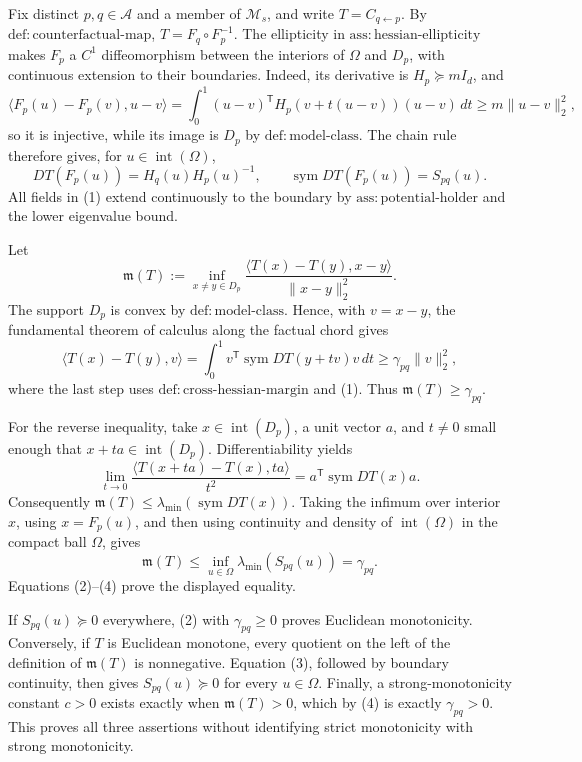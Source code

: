 Fix distinct \(p,q\in\mathcal A\) and a member of \(\mathcal M_s\), and write \(T=C_{q\leftarrow p}\).  By \(\mathrm{def:counterfactual\text{-}map}\), \(T=F_q\circ F_p^{-1}\).  The ellipticity in \(\mathrm{ass:hessian\text{-}ellipticity}\) makes \(F_p\) a \(C^1\) diffeomorphism between the interiors of \(\Omega\) and \(D_p\), with continuous extension to their boundaries.  Indeed, its derivative is \(H_p\succeq mI_d\), and
\[
 \langle F_p(u)-F_p(v),u-v\rangle
 =\int_0^1 (u-v)^{\mathsf T}H_p(v+t(u-v))(u-v)\,dt
 \ge m\lVert u-v\rVert_2^2,
\]
so it is injective, while its image is \(D_p\) by \(\mathrm{def:model\text{-}class}\).  The chain rule therefore gives, for \(u\in\operatorname{int}(\Omega)\),
\[
 DT(F_p(u))=H_q(u)H_p(u)^{-1},
 \qquad
 \operatorname{sym}DT(F_p(u))=S_{pq}(u).
 \tag{1}
\]
All fields in (1) extend continuously to the boundary by \(\mathrm{ass:potential\text{-}holder}\) and the lower eigenvalue bound.

Let
\[
 \mathfrak m(T):=\inf_{x\ne y\in D_p}
 \frac{\langle T(x)-T(y),x-y\rangle}{\lVert x-y\rVert_2^2}.
\]
The support \(D_p\) is convex by \(\mathrm{def:model\text{-}class}\).  Hence, with \(v=x-y\), the fundamental theorem of calculus along the factual chord gives
\[
 \langle T(x)-T(y),v\rangle
 =\int_0^1v^{\mathsf T}\operatorname{sym}DT(y+tv)v\,dt
 \ge\gamma_{pq}\lVert v\rVert_2^2,
 \tag{2}
\]
where the last step uses \(\mathrm{def:cross\text{-}hessian\text{-}margin}\) and (1).  Thus \(\mathfrak m(T)\ge\gamma_{pq}\).

For the reverse inequality, take \(x\in\operatorname{int}(D_p)\), a unit vector \(a\), and \(t\ne0\) small enough that \(x+ta\in\operatorname{int}(D_p)\).  Differentiability yields
\[
 \lim_{t\to0}
 \frac{\langle T(x+ta)-T(x),ta\rangle}{t^2}
 =a^{\mathsf T}\operatorname{sym}DT(x)a.
 \tag{3}
\]
Consequently \(\mathfrak m(T)\le\lambda_{\min}(\operatorname{sym}DT(x))\).  Taking the infimum over interior \(x\), using \(x=F_p(u)\), and then using continuity and density of \(\operatorname{int}(\Omega)\) in the compact ball \(\Omega\), gives
\[
 \mathfrak m(T)
 \le\inf_{u\in\Omega}\lambda_{\min}(S_{pq}(u))
 =\gamma_{pq}.
 \tag{4}
\]
Equations (2)--(4) prove the displayed equality.

If \(S_{pq}(u)\succeq0\) everywhere, (2) with \(\gamma_{pq}\ge0\) proves Euclidean monotonicity.  Conversely, if \(T\) is Euclidean monotone, every quotient on the left of the definition of \(\mathfrak m(T)\) is nonnegative.  Equation (3), followed by boundary continuity, then gives \(S_{pq}(u)\succeq0\) for every \(u\in\Omega\).  Finally, a strong-monotonicity constant \(c>0\) exists exactly when \(\mathfrak m(T)>0\), which by (4) is exactly \(\gamma_{pq}>0\).  This proves all three assertions without identifying strict monotonicity with strong monotonicity.

